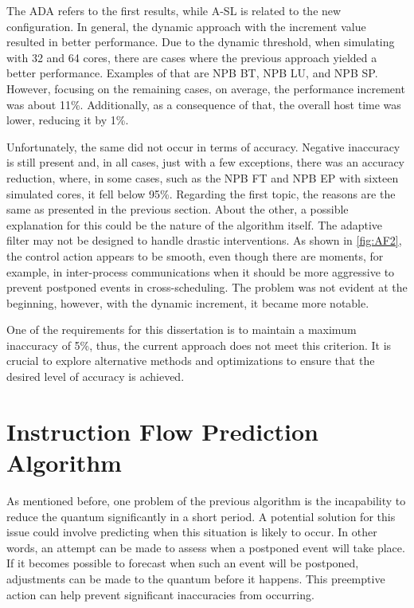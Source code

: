 The ADA refers to the first results, while A-SL is related to the new configuration. In general, the dynamic approach with the 
increment value resulted in better performance. Due to the dynamic threshold, when simulating with 32 and 64 cores, there are cases where the
previous approach yielded a better performance. Examples of that are NPB BT, NPB LU, and NPB SP. However, focusing on the remaining cases, 
on average, the performance increment was about 11\%. Additionally, as a consequence of that, the overall host 
time was lower, reducing it by 1\%.

Unfortunately, the same did not occur in terms of accuracy. Negative inaccuracy is still present and, in all cases, just with a few exceptions, 
there was an accuracy reduction, where, in some cases, such as the NPB FT and NPB EP with sixteen simulated cores, it fell below 95\%. 
Regarding the first topic, the reasons are the same as presented in the previous section. About the other,  
a possible explanation for this could be the nature of the algorithm itself. The adaptive filter may not be designed to 
handle drastic interventions. As shown in \autoref{fig:AF2}, the control action appears to be smooth, even though there are moments, for example, 
in inter-process communications when it should be more aggressive to prevent postponed events in cross-scheduling. The problem was not evident at 
the beginning, however, with the dynamic increment, it became more notable. 

One of the requirements for this dissertation is to maintain a maximum inaccuracy of 5\%, thus, the current approach does not meet this criterion. 
It is crucial to explore alternative methods and optimizations to ensure that the desired level of accuracy is achieved.

\section{Instruction Flow Prediction Algorithm}

As mentioned before, one problem of the previous algorithm is the incapability to reduce the quantum significantly in a short period. A potential 
solution for this issue could involve predicting when this situation is likely to occur. In other words, an attempt can be made to assess when a 
postponed event will take place. If it becomes possible to forecast when such an event will be postponed, adjustments can be made to the quantum 
before it happens. This preemptive action can help prevent significant inaccuracies from occurring. 

